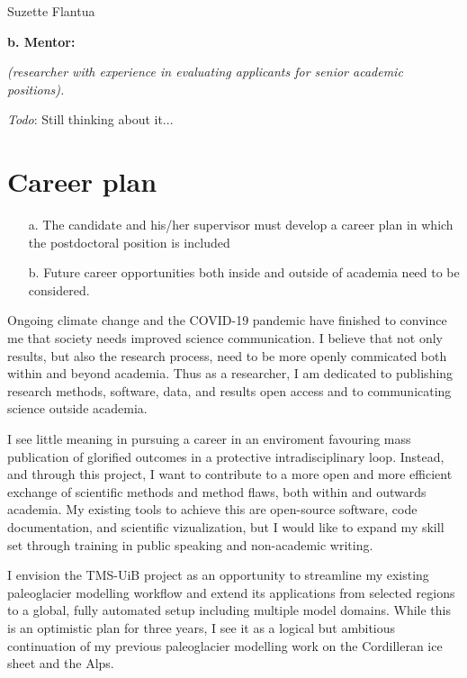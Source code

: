 \documentclass{article}
\newcommand{\guideline}[1]{{\color{color2}\itshape{#1}}}
\newcommand{\todo}[1]{{\color{red}\emph{Todo}: #1}}
\begin{document}
    Suzette Flantua

    \textbf{b. Mentor:}

    \guideline{
        (researcher with experience in evaluating applicants for senior
        academic positions).}

    \todo{Still thinking about it...}


\section{Career plan}

    \guideline{
        \begin{itemize}
          \item[a.] The candidate and his/her supervisor must develop a career
            plan in which the postdoctoral position is included
          \item[b.] Future career opportunities both inside and outside of
            academia need to be considered.
        \end{itemize}}

    Ongoing climate change and the COVID-19 pandemic have finished to convince
    me that society needs improved science communication. I believe that not
    only results, but also the research process, need to be more openly
    commicated both within and beyond academia. Thus as a researcher, I am
    dedicated to publishing research methods, software, data, and
    results open access and to communicating science outside academia.

    I see little meaning in pursuing a career in an enviroment favouring mass
    publication of glorified outcomes in a protective intradisciplinary loop.
    Instead, and through this project, I want to contribute to a more open and
    more efficient exchange of scientific methods and method flaws,
    both within and outwards academia. My existing
    tools to achieve this are open-source software, code documentation, and
    scientific vizualization, but I would like to expand my skill set through
    training in public speaking and non-academic writing.

    I envision the TMS-UiB project as an opportunity to
    streamline my existing paleoglacier modelling workflow and extend its
    applications from selected regions to a global, fully automated setup including
    multiple model domains. While this is an optimistic plan for three years, I
    see it as a logical but ambitious continuation of my previous paleoglacier
    modelling work on the Cordilleran ice sheet and the Alps.
\end{document}
